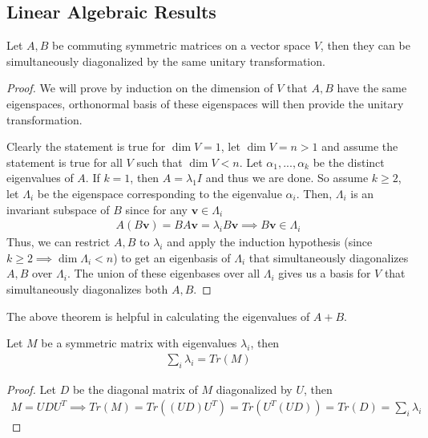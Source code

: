 \documentclass{math}
\renewcommand{\vec}[1]{\boldsymbol{#1}}
\begin{document}
\subsection{Linear Algebraic Results}

\begin{theorem}
    Let $A, B$ be commuting symmetric matrices on a vector space $V$, then they can be simultaneously diagonalized by the same unitary transformation.
\end{theorem}
\begin{proof}
    We will prove by induction on the dimension of $V$ that $A, B$ have the same eigenspaces,
    orthonormal basis of these eigenspaces will then provide the unitary transformation.

    Clearly the statement is true for $\dim V = 1$, let $\dim V = n > 1$ and assume the statement is true for all $V$ such that $\dim V < n$.
    Let $\alpha_1, ..., \alpha_k$ be the distinct eigenvalues of $A$. If $k = 1$, then $A = \lambda_1 I$ and thus we are done.
    So assume $k \geq 2$, let $\Lambda_i$ be the eigenspace corresponding to the eigenvalue $\alpha_i$.
    Then, $\Lambda_i$ is an invariant subspace of $B$ since for any $\vec{v} \in \Lambda_i$
    \begin{align*}
        A(B\vec{v}) = BA\vec{v} = \lambda_i B \vec{v} \implies B\vec{v} \in \Lambda_i
    \end{align*}
    Thus, we can restrict $A, B$ to $\lambda_i$ and apply the induction hypothesis (since $k \geq 2 \implies \dim \Lambda_i < n$)
    to get an eigenbasis of $\Lambda_i$ that simultaneously diagonalizes $A, B$ over $\Lambda_i$. The union of these eigenbases over all $\Lambda_i$ gives us a basis for $V$
    that simultaneously diagonalizes both $A, B$.
\end{proof}

The above theorem is helpful in calculating the eigenvalues of $A + B$.

\begin{theorem}
    Let $M$ be a symmetric matrix with eigenvalues $\lambda_i$, then
    \begin{align*}
        \sum_i \lambda_i = Tr(M)
    \end{align*}
\end{theorem}
\begin{proof}
    Let $D$ be the diagonal matrix of $M$ diagonalized by $U$, then
    \begin{align*}
        M = UDU^T \implies Tr(M) = Tr((UD)U^T) = Tr(U^T (UD)) = Tr(D) = \sum_i \lambda_i
    \end{align*}
\end{proof}
\end{document}
